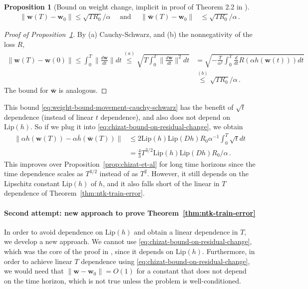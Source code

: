 \documentclass[11pt]{article} %
\newcommand{\<}{\langle}
\renewcommand{\>}{\rangle}
\def\bw{{\boldsymbol w}}
\newcommand{\Lip}{\mathrm{Lip}}
\theoremstyle{plain}
\newtheorem{proposition}[theorem]{Proposition}
\theoremstyle{definition}
\theoremstyle{remark}
\begin{document}
\begin{proposition}[Bound on weight change, implicit in proof of Theorem 2.2 in \cite{chizat2019lazy}]\label{prop:sqrtTweightchange}\label{prop:sqrtTweightchange-stronger}
\begin{align}\label{eq:weight-bound-movement-cauchy-schwarz}
\|\bw(T) - \bw_0\| \leq \sqrt{TR_0} / \alpha \quad \mbox{ and } \quad \|\bar\bw(T) - \bw_0\| &\leq \sqrt{TR_0} /\alpha\,.
\end{align}
\end{proposition}
\begin{proof}[Proof of Proposition~\ref{prop:sqrtTweightchange}]
By (a) Cauchy-Schwarz, and (b) the nonnegativity of the loss $R$,
\begin{align*}
\|\bw(T) - \bw(0)\| \leq \int_{0}^{T} \|\frac{d\bw}{dt}\|dt \stackrel{(a)}{\leq} \sqrt{T \int_{0}^{T} \|\frac{d\bw}{dt}\|^2 dt} &= \sqrt{-\frac{T}{\alpha^2}\int_{0}^{T} \frac{d}{dt} R(\alpha h(\bw(t))) dt} \\
&\stackrel{(b)}{\leq} \sqrt{T R_0} / \alpha\, .
\end{align*}
The bound for $\bar\bw$ is analogous.
\end{proof}

This bound \eqref{eq:weight-bound-movement-cauchy-schwarz} has the benefit of $\sqrt{t}$ dependence (instead of linear $t$ dependence), and also does not depend on $\Lip(h)$. So if we plug it into \eqref{eq:chizat-bound-on-residual-change}, we obtain
\begin{align*}
\|\alpha h(\bw(T)) - \alpha \bar{h}(\bar\bw(T))\| &\leq 2\Lip(h) \Lip(Dh) R_0 \alpha^{-1} \int_{0}^T \sqrt{t}  dt \\
&= \frac{4}{3} T^{3/2} \Lip(h) \Lip(Dh) R_0 / \alpha\,.
\end{align*}
This improves over Proposition~\ref{prop:chizat-et-al} for long time horizons since the time dependence scales as $T^{3/2}$ instead of as $T^2$. However, it still depends on the Lipschitz constant $\Lip(h)$ of $h$, and it also falls short of the linear in $T$ dependence of Theorem~\ref{thm:ntk-train-error}.

\paragraph{Second attempt: new approach to prove Theorem~\ref{thm:ntk-train-error}}
In order to avoid dependence on $\Lip(h)$ and obtain a linear dependence in $T$, we develop a new approach. We cannot use \eqref{eq:chizat-bound-on-residual-change}, which was the core of the proof in \cite{chizat2019lazy}, since it depends on $\Lip(h)$. Furthermore, in order to achieve linear $T$ dependence using \eqref{eq:chizat-bound-on-residual-change}, we would need that $\|\bw - \bw_0\| = O(1)$ for a constant that does not depend on the time horizon, which is not true unless the problem is well-conditioned.
\end{document}

